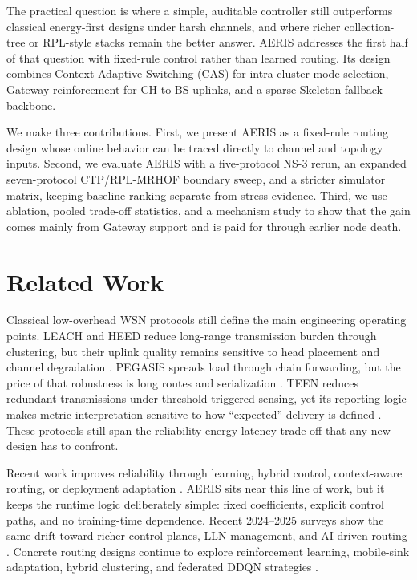 \documentclass[conference]{IEEEtran}
\begin{document}
The practical question is where a simple, auditable controller still outperforms classical energy-first designs under harsh channels, and where richer collection-tree or RPL-style stacks remain the better answer. AERIS addresses the first half of that question with fixed-rule control rather than learned routing. Its design combines Context-Adaptive Switching (CAS) for intra-cluster mode selection, Gateway reinforcement for CH-to-BS uplinks, and a sparse Skeleton fallback backbone.

We make three contributions. First, we present AERIS as a fixed-rule routing design whose online behavior can be traced directly to channel and topology inputs. Second, we evaluate AERIS with a five-protocol NS-3 rerun, an expanded seven-protocol CTP/RPL-MRHOF boundary sweep, and a stricter simulator matrix, keeping baseline ranking separate from stress evidence. Third, we use ablation, pooled trade-off statistics, and a mechanism study to show that the gain comes mainly from Gateway support and is paid for through earlier node death.

\section{Related Work}
Classical low-overhead WSN protocols still define the main engineering operating points. LEACH and HEED reduce long-range transmission burden through clustering, but their uplink quality remains sensitive to head placement and channel degradation \cite{heinzelman2002application,younis2004heed}. PEGASIS spreads load through chain forwarding, but the price of that robustness is long routes and serialization \cite{lindsey2002pegasis}. TEEN reduces redundant transmissions under threshold-triggered sensing, yet its reporting logic makes metric interpretation sensitive to how ``expected'' delivery is defined \cite{manjeshwar2001teen}. These protocols still span the reliability-energy-latency trade-off that any new design has to confront.

Recent work improves reliability through learning, hybrid control, context-aware routing, or deployment adaptation \cite{kumar2019machine,hu2024security,pushpa2025optimizing,tossa2025wireless,wang2024energy,khedr2025advancing,almutairi2025secured}. AERIS sits near this line of work, but it keeps the runtime logic deliberately simple: fixed coefficients, explicit control paths, and no training-time dependence. Recent 2024--2025 surveys show the same drift toward richer control planes, LLN management, and AI-driven routing \cite{almutairi2024survey,djennadi2025exploring,thakur2025ai}. Concrete routing designs continue to explore reinforcement learning, mobile-sink adaptation, hybrid clustering, and federated DDQN strategies \cite{ren2023mefi,okine2024multi,singh2025enhanced,bhukya2025hybrid}.
\end{document}
